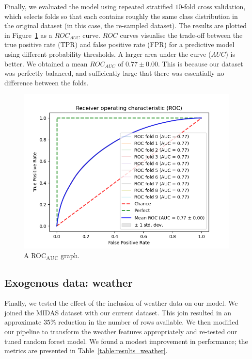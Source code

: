 \documentclass[12pt,a4paper]{article}
\begin{document}
Finally, we evaluated the model using repeated stratified $10$-fold cross validation, which selects folds so that each contains roughly the same class distribution in the original dataset (in this case, the re-sampled dataset). The results are plotted in Figure~\ref{fig:roc} as a $ROC_{AUC}$ curve. $ROC$ curves visualise the trade-off between the true positive rate (TPR) and false positive rate (FPR) for a predictive model using different probability thresholds. A larger area under the curve ($AUC$) is better. We obtained a mean $ROC_{AUC}$ of $0.77 \pm 0.00$. This is because our dataset was perfectly balanced, and sufficiently large that there was essentially no difference between the folds.  

\begin{figure}[h!]
  \centering
  \includegraphics[width=0.85\linewidth,height=0.5\textheight,keepaspectratio]{images/roc_auc_10.png}
  \caption{A ROC\textsubscript{AUC} graph.}
  \label{fig:roc}
\end{figure}

\subsection{Exogenous data: weather}

Finally, we tested the effect of the inclusion of weather data on our model. We joined the MIDAS dataset with our current dataset. This join resulted in an approximate $35\%$ reduction in the number of rows available. We then modified our pipeline to transform the weather features appropriately and re-tested our tuned random forest model. We found a modest improvement in performance; the metrics are presented in Table~\ref{table:results_weather}.
\end{document}
